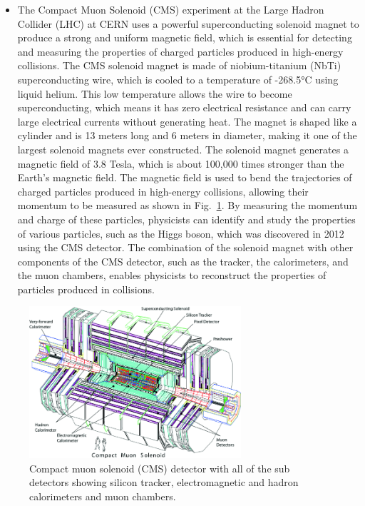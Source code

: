 \begin{itemize}
\item The Compact Muon Solenoid (CMS) experiment at the Large Hadron Collider (LHC) at CERN uses a powerful superconducting solenoid magnet to produce a strong and uniform magnetic field, which is essential for detecting and measuring the properties of charged particles produced in high-energy collisions. The CMS solenoid magnet is made of niobium-titanium (NbTi) superconducting wire, which is cooled to a temperature of -268.5°C using liquid helium. This low temperature allows the wire to become superconducting, which means it has zero electrical resistance and can carry large electrical currents without generating heat. The magnet is shaped like a cylinder and is 13 meters long and 6 meters in diameter, making it one of the largest solenoid magnets ever constructed. The solenoid magnet generates a magnetic field of 3.8 Tesla, which is about 100,000 times stronger than the Earth's magnetic field. The magnetic field is used to bend the trajectories of charged particles produced in high-energy collisions, allowing their momentum to be measured as shown in Fig.~\ref{fig:cms}. By measuring the momentum and charge of these particles, physicists can identify and study the properties of various particles, such as the Higgs boson, which was discovered in 2012 using the CMS detector. The combination of the solenoid magnet with other components of the CMS detector, such as the tracker, the calorimeters, and the muon chambers, enables physicists to reconstruct the properties of particles produced in collisions.


\end{itemize}

\begin{figure}[!htp]
\centering
\includegraphics[width=0.7\textwidth]{ashish_thesis/cms_exp.png}
\caption{%
   Compact muon solenoid (CMS) detector with all of the sub detectors showing silicon tracker, electromagnetic and hadron calorimeters and muon chambers. 
}
\label{fig:cms}
\end{figure}




